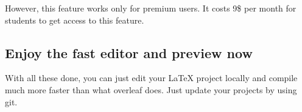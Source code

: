 However, this feature works only for premium users. It costs 9\$ per month for students to get access to this feature.

\subsection*{Enjoy the fast editor and preview now}

With all these done, you can just edit your LaTeX project locally and compile much more faster than what overleaf does. Just update your projects by using git.

